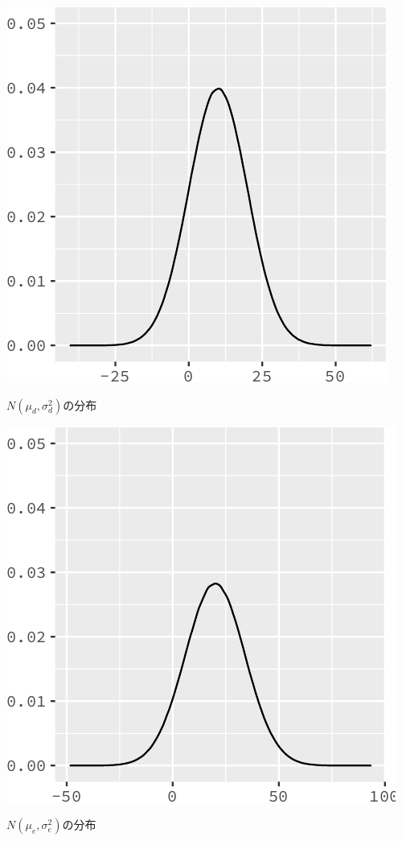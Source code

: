\documentclass[]{tufte-handout}
\begin{document}
\begin{marginfigure}

{\centering \includegraphics{AdditivityOfVariance_files/figure-latex/unnamed-chunk-8-1} 

}

\caption[$N(\mu_d, \sigma^2_d)$の分布]{$N(\mu_d, \sigma^2_d)$の分布}\label{fig:unnamed-chunk-8}
\end{marginfigure}

\begin{marginfigure}

{\centering \includegraphics{AdditivityOfVariance_files/figure-latex/unnamed-chunk-9-1} 

}

\caption[$N(\mu_e, \sigma^2_e)$の分布]{$N(\mu_e, \sigma^2_e)$の分布}\label{fig:unnamed-chunk-9}
\end{marginfigure}
\end{document}
